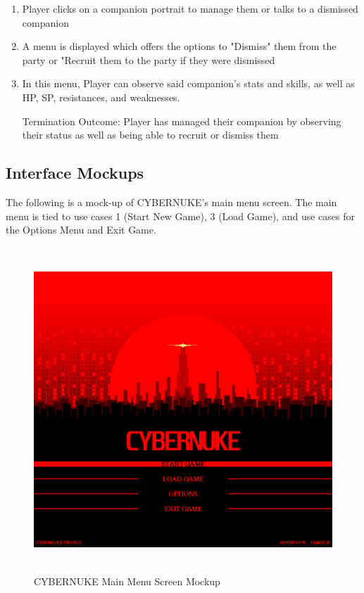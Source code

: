 \documentclass[10pt,conference,onecolumn,compsoc]{IEEEtran}
\begin{document}
\begin{enumerate}
\item Player clicks on a companion portrait to manage them or talks to a dismissed companion
\item A menu is displayed which offers the options to "Dismiss" them from the party or "Recruit them to the party if they were dismissed
\item In this menu, Player can observe said companion's stats and skills, as well as HP, SP, resistances, and weaknesses.
\item [Termination Outcome:] Player has managed their companion by observing their status as well as being able to recruit or dismiss them
\end{enumerate}

\pagebreak
\subsection{Interface Mockups}

The following is a mock-up of CYBERNUKE's main menu screen. The main menu is tied to use cases 1 (Start New Game), 3 (Load Game), and use cases for the Options Menu and Exit Game.
\begin{figure}[ht!]
\centering
\includegraphics[height=462px, width=500px]{Mockups/CYBERNUKE_MAIN_MENU_2.png}
\caption{CYBERNUKE Main Menu Screen Mockup}
\label{main_menu_mockup}
\end{figure}
\end{document}
